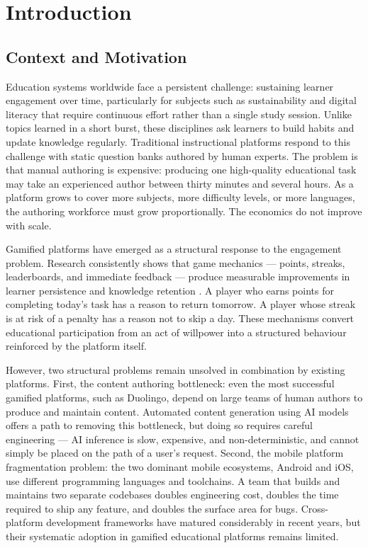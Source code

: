 %
%
\chapter{Introduction}
\label{chap:introduction}

\section{Context and Motivation}

Education systems worldwide face a persistent challenge: sustaining learner engagement over time, particularly for subjects such as sustainability and digital literacy that require continuous effort rather than a single study session. Unlike topics learned in a short burst, these disciplines ask learners to build habits and update knowledge regularly. Traditional instructional platforms respond to this challenge with static question banks authored by human experts. The problem is that manual authoring is expensive: producing one high-quality educational task may take an experienced author between thirty minutes and several hours. As a platform grows to cover more subjects, more difficulty levels, or more languages, the authoring workforce must grow proportionally. The economics do not improve with scale.

Gamified platforms have emerged as a structural response to the engagement problem. Research consistently shows that game mechanics --- points, streaks, leaderboards, and immediate feedback --- produce measurable improvements in learner persistence and knowledge retention \cite{hamari2014does}. A player who earns points for completing today's task has a reason to return tomorrow. A player whose streak is at risk of a penalty has a reason not to skip a day. These mechanisms convert educational participation from an act of willpower into a structured behaviour reinforced by the platform itself.

However, two structural problems remain unsolved in combination by existing platforms. First, the content authoring bottleneck: even the most successful gamified platforms, such as Duolingo, depend on large teams of human authors to produce and maintain content. Automated content generation using AI models offers a path to removing this bottleneck, but doing so requires careful engineering --- AI inference is slow, expensive, and non-deterministic, and cannot simply be placed on the path of a user's request. Second, the mobile platform fragmentation problem: the two dominant mobile ecosystems, Android and iOS, use different programming languages and toolchains. A team that builds and maintains two separate codebases doubles engineering cost, doubles the time required to ship any feature, and doubles the surface area for bugs. Cross-platform development frameworks have matured considerably in recent years, but their systematic adoption in gamified educational platforms remains limited.

